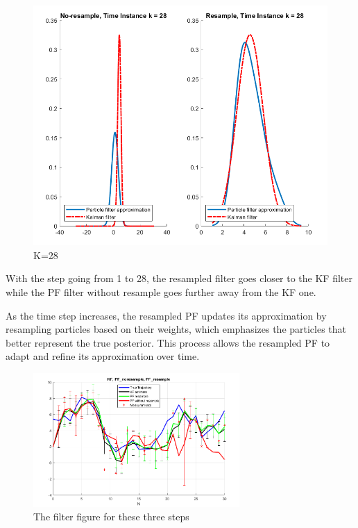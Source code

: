 \begin{figure}[H]
    \hfill
    \begin{minipage}[b]{0.4\textwidth}
      \centering
      \includegraphics[width=\textwidth]{images/K=28.png}
      \caption{K=28}
      \label{fig:K=28}
    \end{minipage}
   \end{figure}
   
With the step going from 1 to 28, the resampled filter goes closer to the KF filter while the PF filter without resample goes further away from the KF one.

As the time step increases, the resampled PF updates its approximation by resampling particles based on their weights, which emphasizes the particles that better represent the true posterior. This process allows the resampled PF to adapt and refine its approximation over time.

\begin{figure}[H]
 \centering
 \includegraphics[width=0.7\textwidth]{images/pairfigure.png}
 \caption{The filter figure for these three steps}
 \label{S}
\end{figure}
  


